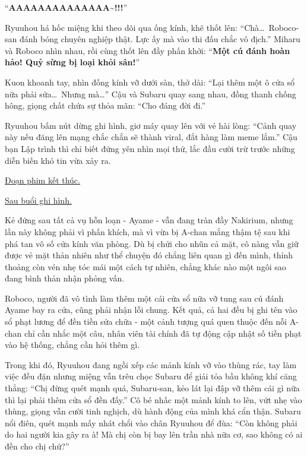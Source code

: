 \documentclass[../main.tex]{subfiles}
\begin{document}
``\textbf{AAAAAAAAAAAAAA\~{}!!!}''

Ryuuhou há hốc miệng khi theo dõi qua ống kính, khẽ thốt lên: ``Chà\dots\ Roboco-san đánh bóng chuyên nghiệp thật. Lực ấy mà vào thi đấu chắc vô địch.'' Miharu và Roboco nhìn nhau, rồi cùng thốt lên đầy phấn khởi: ``\textbf{Một cú đánh hoàn hảo! Quỷ sừng bị loại khỏi sân!}''

Kuon khoanh tay, nhìn đống kính vỡ dưới sàn, thở dài: ``Lại thêm một ô cửa sổ nữa phải sửa\dots\ Nhưng mà\dots'' Cậu và Subaru quay sang nhau, đồng thanh chống hông, giọng chất chứa sự thỏa mãn: ``Cho đáng đời đi.''

Ryuuhou bấm nút dừng ghi hình, giơ máy quay lên với vẻ hài lòng: ``Cảnh quay này nếu đăng lên mạng chắc chắn sẽ thành viral, đắt hàng làm meme lắm.'' Cậu bạn Lập trình thì chỉ biết đứng yên nhìn mọi thứ, lắc đầu cười trừ trước những diễn biến khó tin vừa xảy ra.

\begin{center}
  \uline{Đoạn phim kết thúc.}
\end{center}

\omk

\begin{center}
  \uline{Sau buổi ghi hình.}
\end{center}

Kẻ đứng sau tất cả vụ hỗn loạn - Ayame - vẫn đang tràn đầy Nakirium, nhưng lần này không phải vì phấn khích, mà vì vừa bị A-chan mắng thậm tệ sau khi phá tan vô số cửa kính văn phòng. Dù bị chửi cho nhũn cả mặt, cô nàng vẫn giữ được vẻ mặt thản nhiên như thể chuyện đó chẳng liên quan gì đến mình, thỉnh thoảng còn vén nhẹ tóc mái một cách tự nhiên, chẳng khác nào một ngôi sao đang bình thản nhận phỏng vấn.

Roboco, người đã vô tình làm thêm một cái cửa sổ nữa vỡ tung sau cú đánh Ayame bay ra cửa, cũng phải nhận lỗi chung. Kết quả, cả hai đều bị ghi tên vào sổ phạt lương để đền tiền sửa chữa - một cảnh tượng quá quen thuộc đến nỗi A-chan chỉ cần nhắc một câu, nhân viên tài chính đã tự động cập nhật số tiền phạt vào hệ thống, chẳng cần hỏi thêm gì.

Trong khi đó, Ryuuhou đang ngồi xếp các mảnh kính vỡ vào thùng rác, tay làm việc đều đặn nhưng miệng vẫn trêu chọc Subaru để giải tỏa bầu không khí căng thẳng: ``Chị đừng quét mạnh quá, Subaru-san, kẻo lát lại đập vỡ thêm cái gì nữa thì lại phải thêm cửa sổ đền đấy.'' Cô bé nhấc một mảnh kính to lên, vứt nhẹ vào thùng, giọng vẫn cười tinh nghịch, dù hành động của mình khá cẩn thận. Subaru nổi điên, quét mạnh mấy nhát chổi vào chân Ryuuhou để đùa: ``Còn không phải do hai người kia gây ra à! Mà chị còn bị bay lên trần nhà nữa cơ, sao không có ai đền cho chị chứ?''
\end{document}
